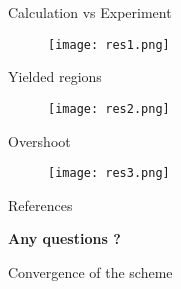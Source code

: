 \begin{frame}{Calculation vs Experiment}

    \begin{figure}[h!]
        \texttt{[image: res1.png]}
    \end{figure}

\end{frame}

\begin{frame}{Yielded regions}

    \begin{figure}[h!]
        \texttt{[image: res2.png]}
    \end{figure}

\end{frame}

\begin{frame}{Overshoot}
    \begin{center}
    
        \begin{figure}[h!]
            \texttt{[image: res3.png]}
        \end{figure}
    \end{center}
\end{frame}


\begin{frame}{References}
    \raggedright
    \nocite{*}
    
    
    \vfill
    \begin{center}
        \Large
        \textcolor{titlecolor}{\textbf{Any questions ?}}
    \end{center} 
\end{frame}

\begin{frame}{Convergence of the scheme}
    \begin{center}


    
    

    \end{center}
\end{frame}


